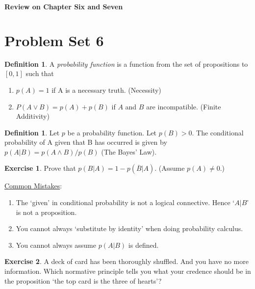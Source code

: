 \documentclass[12pt]{article}
\theoremstyle{definition}
\newtheorem{defin}[theo]{Definition}
\newtheorem{exer}{Exercise}
\begin{document}


\begin{center}
{\Large \bf Review on Chapter Six and Seven}
\end{center}

\smallskip

\section{Problem Set 6}

\begin{defin}
A \textit{probability function} is a function from the set of propositions to $[0, 1]$ such that 
\begin{enumerate}
\item $p(A)=1$ if A is a necessary truth. (Necessity)
\item $P(A \lor B) = p(A) + p(B)$ if $A$ and $B$ are incompatible. (Finite Additivity)
\end{enumerate}
\end{defin}

\begin{defin}
Let $p$ be a probability function. Let $p(B)>0$. The conditional probability of A given that B has occurred is given by $p(A|B)=p(A \land B)/p(B)$ (The Bayes' Law).
\end{defin}

\begin{exer}
Prove that $p(B|A)=1-p(\overline{B}|A)$. (Assume $p(A) \neq 0$.)
\end{exer}

\noindent
\underline{Common Mistakes}:
\begin{enumerate}
\item The `given' in conditional probability is not a logical connective. Hence `$A|B$' is not a proposition.
\item  You cannot always `substitute by identity' when doing probability calculus.
\item You cannot always assume $p(A|B)$ is defined. 
\end{enumerate}

\begin{exer}
A deck of card has been thoroughly shuffled. And you have no more information. Which normative principle tells you what your credence should be in the proposition `the top card is the three of hearts'?
\end{exer}
\end{document}
